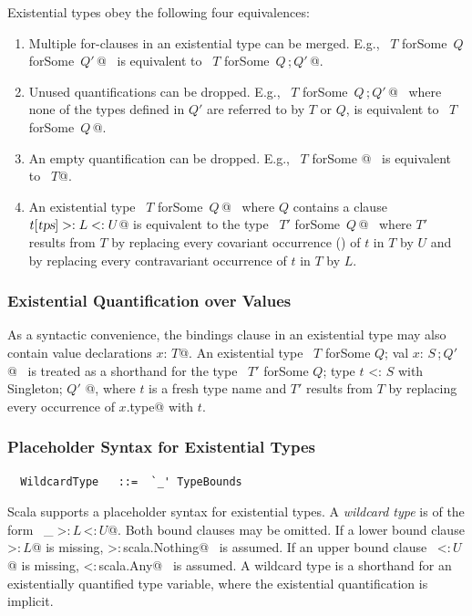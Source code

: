 Existential types obey the following four equivalences:
\begin{enumerate}
\item
Multiple for-clauses in an existential type can be merged. E.g.,
~\lstinline@$T$ forSome {$\,Q\,$} forSome {$\,Q'\,$}@~
is equivalent to
~\lstinline@$T$ forSome {$\,Q\,$;$\,Q'\,$}@.
\item
Unused quantifications can be dropped. E.g.,
~\lstinline@$T$ forSome {$\,Q\,$;$\,Q'\,$}@~
where none of the types defined in $Q'$ are referred to by $T$ or $Q$,
is equivalent to
~\lstinline@$T$ forSome {$\,Q\,$}@.
\item
An empty quantification can be dropped. E.g.,
~\lstinline@$T$ forSome { }@~ is equivalent to ~\lstinline@$T$@.
\item
An existential type ~\lstinline@$T$ forSome {$\,Q\,$}@~ where $Q$ contains
a clause ~\lstinline@type $t[\mbox{\sl tps}] >: L <: U$@ is equivalent 
to the type ~\lstinline@$T'$ forSome {$\,Q\,$}@~ where $T'$ results from $T$ by replacing every
covariant occurrence () of $t$ in $T$ by $U$ and by replacing every
contravariant occurrence of $t$ in $T$ by $L$.
\end{enumerate}

\subsubsection*{Existential Quantification over Values}\label{sec:val-existential-types}

As a syntactic convenience, the bindings clause
in an existential type may also contain
value declarations \lstinline@val $x$: $T$@. 
An existential type ~\lstinline@$T$ forSome { $Q$; val $x$: $S\,$;$\,Q'$ }@~
is treated as a shorthand for the type
~\lstinline@$T'$ forSome { $Q$; type $t$ <: $S$ with Singleton; $Q'$ }@, where $t$ is a fresh
type name and $T'$ results from $T$ by replacing every occurrence of 
\lstinline@$x$.type@ with $t$.

\subsubsection*{Placeholder Syntax for Existential Types}\label{sec:impl-existential-types}

\syntax\begin{lstlisting}
  WildcardType   ::=  `_' TypeBounds
\end{lstlisting}

Scala supports a placeholder syntax for existential types.
A {\em wildcard type} is of the form ~\lstinline@_$\;$>:$\,L\,$<:$\,U$@. Both bound
clauses may be omitted. If a lower bound clause \lstinline@>:$\,L$@ is missing, 
\lstinline@>:$\,$scala.Nothing@~
is assumed. If an upper bound clause ~\lstinline@<:$\,U$@ is missing, 
\lstinline@<:$\,$scala.Any@~ is assumed. A wildcard type is a shorthand for an 
existentially quantified type variable, where the existential quantification is implicit.

